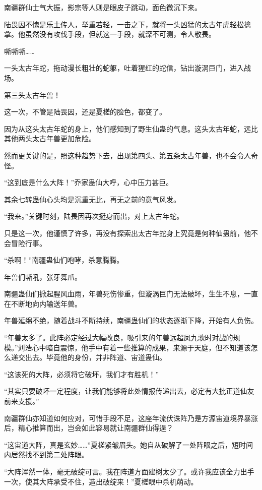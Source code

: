 
\begin{this_body}

南疆群仙士气大振，影宗等人则是眼皮子跳动，面色微沉下来。

陆畏因不愧是乐土传人，举重若轻，一击之下，就将一头凶猛的太古年虎轻松擒拿。他虽然没有攻伐手段，但就这一手段，就深不可测，令人敬畏。

嘶嘶嘶……

一头太古年蛇，拖动漫长粗壮的蛇躯，吐着猩红的蛇信，钻出漩涡巨门，进入战场。

第三头太古年兽！

这一次，不管是陆畏因，还是夏槎的脸色，都变了。

因为从这头太古年蛇的身上，他们感知到了野生仙蛊的气息。这头太古年蛇，远比其他两头太古年兽更加危险。

然而更关键的是，照这种趋势下去，出现第四头、第五条太古年兽，也不会令人奇怪。

“这到底是什么大阵！”乔家蛊仙大呼，心中压力甚巨。

其余七转蛊仙心头均是沉重无比，再无之前的意气风发。

“我来。”关键时刻，陆畏因再次挺身而出，对上太古年蛇。

只是这一次，他谨慎了许多，再没有探索出太古年蛇身上究竟是何种仙蛊前，他不会冒险行事。

“杀啊！”南疆蛊仙们咆哮，杀意腾腾。

年兽们嘶吼，张牙舞爪。

南疆蛊仙们掀起腥风血雨，年兽死伤惨重，但漩涡巨门无法破坏，生生不息，一直在不断地向内输送年兽。

年兽延绵不绝，随着战斗不断持续，南疆蛊仙们的状态逐渐下降，开始有人负伤。

“年兽太多了。此阵必定经过大幅改良，吸引来的年兽远超凤九歌时对战的规模。”刘浩心中暗自震惊，他手中有着一些推算的成果，来源于天庭，但不知道该怎么递交出去。毕竟他的身份，并非阵道、宙道蛊仙。

“这该死的大阵，必须将它破坏，我们才有胜机！”

“其实只要破坏一定程度，让我们能够将此处情报传递出去，必定有大批正道仙友前来支援。”

南疆群仙亦知道如何应对，可惜手段不足，这座年流伏诛阵乃是方源宙道境界暴涨后，精心推算而出，岂会如此容易就让南疆群仙得逞？

“这宙道大阵，真是玄妙……”夏槎紧皱眉头。她自从破解了一处阵眼之后，短时间内居然找不到第二处阵眼。

“大阵浑然一体，毫无破绽可言。我在阵道方面建树太少了。或许我应该全力出手一次，使其大阵承受不住，造出破绽来！”夏槎眼中杀机萌动。


\end{this_body}
